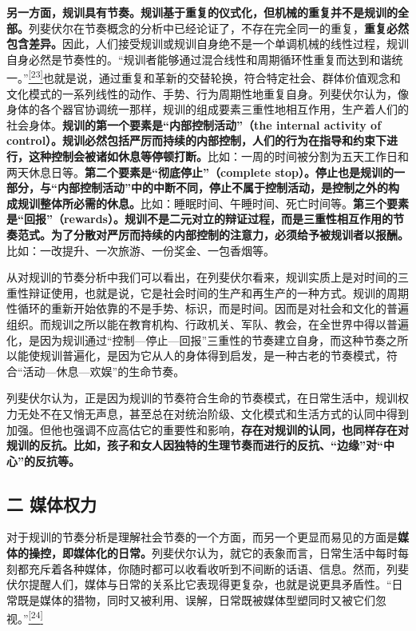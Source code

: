 \documentclass[UTF8, fontset = sourcesans, a4paper, oneside, zihao =
-4, scheme=chinese, no-math, space=true]{ctexbook}
\begin{document}
\textbf{另一方面，规训具有节奏。规训基于重复的仪式化，但机械的重复并不是规训的全部。}列斐伏尔在节奏概念的分析中已经论证了，不存在完全同一的重复，\textbf{重复必然包含差异。}因此，人们接受规训或规训自身绝不是一个单调机械的线性过程，规训自身必然是节奏性的。``规训者能够通过混合线性和周期循环性重复而达到和谐统一。''\protect\hypertarget{part0009_split_003.htmlux5cux23w23}{}{}\protect\hyperlink{part0009_split_004.htmlux5cux23m23}{\textsuperscript{{[}23{]}}}也就是说，通过重复和革新的交替轮换，符合特定社会、群体价值观念和文化模式的一系列线性的动作、手势、行为周期性地重复自身。列斐伏尔认为，像身体的各个器官协调统一那样，规训的组成要素三重性地相互作用，生产着人们的社会身体。\textbf{规训的第一个要素是``内部控制活动''（the
internal activity of
control）。规训必然包括严厉而持续的内部控制，人们的行为在指导和约束下进行，这种控制会被诸如休息等停顿打断。}比如：一周的时间被分割为五天工作日和两天休息日等。\textbf{第二个要素是``彻底停止''（complete
stop）。停止也是规训的一部分，与``内部控制活动''中的中断不同，停止不属于控制活动，是控制之外的构成规训整体所必需的休息。}比如：睡眠时间、午睡时间、死亡时间等。\textbf{第三个要素是``回报''（rewards）。规训不是二元对立的辩证过程，而是三重性相互作用的节奏范式。为了分散对严厉而持续的内部控制的注意力，必须给予被规训者以报酬。}比如：一改提升、一次旅游、一份奖金、一包香烟等。

从对规训的节奏分析中我们可以看出，在列斐伏尔看来，规训实质上是对时间的三重性辩证使用，也就是说，它是社会时间的生产和再生产的一种方式。规训的周期性循环的重新开始依靠的不是手势、标识，而是时间。因而是对社会和文化的普遍组织。而规训之所以能在教育机构、行政机关、军队、教会，在全世界中得以普遍化，是因为规训通过``控制---停止---回报''三重性的节奏建立自身，而这种节奏之所以能使规训普遍化，是因为它从人的身体得到启发，是一种古老的节奏模式，符合``活动---休息---欢娱''的生命节奏。

列斐伏尔认为，正是因为规训的节奏符合生命的节奏模式，在日常生活中，规训权力无处不在又悄无声息，甚至总在对统治阶级、文化模式和生活方式的认同中得到加强。但他也强调不应高估它的重要性和影响，\textbf{存在对规训的认同，也同样存在对规训的反抗。比如，孩子和女人因独特的生理节奏而进行的反抗、``边缘''对``中心''的反抗等。}

\subsection{二 媒体权力}\label{part0009_split_003.htmlux5cux23c051}

对于规训的节奏分析是理解社会节奏的一个方面，而另一个更显而易见的方面是\textbf{媒体的操控，即媒体化的日常。}列斐伏尔认为，就它的表象而言，日常生活中每时每刻都充斥着各种媒体，你随时都可以收看收听到不间断的话语、信息。然而，列斐伏尔提醒人们，媒体与日常的关系比它表现得更复杂，也就是说更具矛盾性。``日常既是媒体的猎物，同时又被利用、误解，日常既被媒体型塑同时又被它们忽视。''\protect\hypertarget{part0009_split_003.htmlux5cux23w24}{}{}\protect\hyperlink{part0009_split_004.htmlux5cux23m24}{\textsuperscript{{[}24{]}}}
\end{document}
